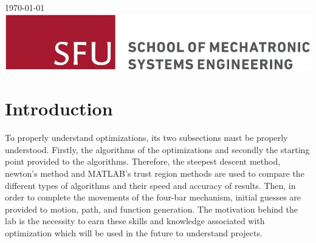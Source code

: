 \documentclass[12pt]{article}
\begin{document}
\begin{titlepage}
{\large \today}\\[2cm] %


\includegraphics[scale=2.0]{MSE-Logo.jpg}\\[1cm] %

\vfill %

\end{titlepage}

\tableofcontents	%

\pagebreak
\listoffigures
{}	%

 \listoftables

\lstlistoflistings
{}

\pagebreak
\setcounter{page}{1}	%
\setlength{\parskip}{1em}

\section{Introduction}
To properly understand optimizations, its two subsections must be properly understood. Firstly, the algorithms of the optimizations and secondly the starting point provided to the algorithms. Therefore, the steepest descent method, newton’s method and MATLAB’s trust region methods are used to compare the different types of algorithms and their speed and accuracy of results.
Then, in order to complete the movements of the four-bar mechanism, initial guesses are provided to motion, path, and function generation. The motivation behind the lab is the necessity to earn these skills and knowledge associated with optimization which will be used in the future to understand projects. 
\end{document}
